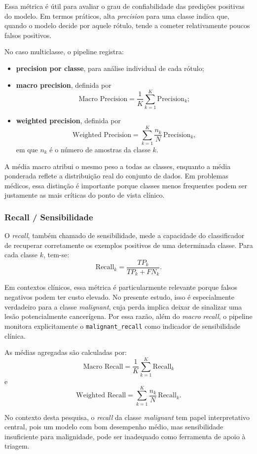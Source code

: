 \documentclass[tcc,capa]{texufpel}
\begin{document}
Essa métrica é útil para avaliar o grau de confiabilidade das predições positivas do modelo. Em termos práticos, alta \textit{precision} para uma classe indica que, quando o modelo decide por aquele rótulo, tende a cometer relativamente poucos falsos positivos.

No caso multiclasse, o pipeline registra:
\begin{itemize}
	\item \textbf{precision por classe}, para análise individual de cada rótulo;
	\item \textbf{macro precision}, definida por
	\[
	\text{Macro Precision}
	=
	\frac{1}{K}\sum_{k=1}^{K}\text{Precision}_k;
	\]
	\item \textbf{weighted precision}, definida por
	\[
	\text{Weighted Precision}
	=
	\sum_{k=1}^{K}\frac{n_k}{N}\,\text{Precision}_k,
	\]
	em que \(n_k\) é o número de amostras da classe \(k\).
\end{itemize}

A média macro atribui o mesmo peso a todas as classes, enquanto a média ponderada reflete a distribuição real do conjunto de dados. Em problemas médicos, essa distinção é importante porque classes menos frequentes podem ser justamente as mais críticas do ponto de vista clínico.

\subsubsection{Recall / Sensibilidade}

O \textit{recall}, também chamado de sensibilidade, mede a capacidade do classificador de recuperar corretamente os exemplos positivos de uma determinada classe. Para cada classe \(k\), tem-se:
\[
\text{Recall}_k
=
\frac{TP_k}{TP_k + FN_k}.
\]

Em contextos clínicos, essa métrica é particularmente relevante porque falsos negativos podem ter custo elevado. No presente estudo, isso é especialmente verdadeiro para a classe \textit{malignant}, cuja perda implica deixar de sinalizar uma lesão potencialmente cancerígena. Por essa razão, além do \textit{macro recall}, o pipeline monitora explicitamente o \texttt{malignant\_recall} como indicador de sensibilidade clínica.

As médias agregadas são calculadas por:
\[
\text{Macro Recall}
=
\frac{1}{K}\sum_{k=1}^{K}\text{Recall}_k
\]
e
\[
\text{Weighted Recall}
=
\sum_{k=1}^{K}\frac{n_k}{N}\,\text{Recall}_k.
\]

No contexto desta pesquisa, o \textit{recall} da classe \textit{malignant} tem papel interpretativo central, pois um modelo com bom desempenho médio, mas sensibilidade insuficiente para malignidade, pode ser inadequado como ferramenta de apoio à triagem.
\end{document}
